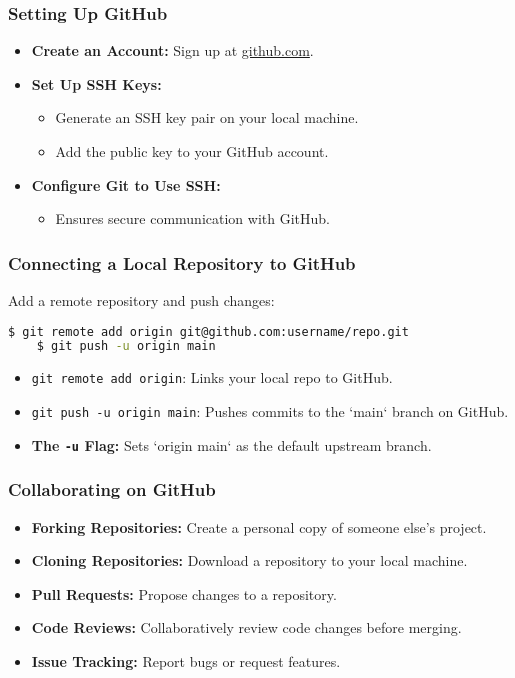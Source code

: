 \begin{frame}
	\frametitle{Setting Up GitHub}
	\begin{itemize}
		\item \textbf{Create an Account:} Sign up at \href{https://github.com}{github.com}.
		\item \textbf{Set Up SSH Keys:}
		\begin{itemize}
			\item Generate an SSH key pair on your local machine.
			\item Add the public key to your GitHub account.
		\end{itemize}
		\item \textbf{Configure Git to Use SSH:}
		\begin{itemize}
			\item Ensures secure communication with GitHub.
		\end{itemize}
	\end{itemize}
\end{frame}


\begin{frame}[fragile]
	\frametitle{Connecting a Local Repository to GitHub}
	Add a remote repository and push changes:
	\begin{lstlisting}[language=bash]
	$ git remote add origin git@github.com:username/repo.git
	$ git push -u origin main
	\end{lstlisting}
	\begin{itemize}
		\item \texttt{git remote add origin}: Links your local repo to GitHub.
		\item \texttt{git push -u origin main}: Pushes commits to the `main` branch on GitHub.
		\item \textbf{The \texttt{-u} Flag:} Sets `origin main` as the default upstream branch.
	\end{itemize}
\end{frame}

\begin{frame}
	\frametitle{Collaborating on GitHub}
	\begin{itemize}
		\item \textbf{Forking Repositories:} Create a personal copy of someone else's project.
		\item \textbf{Cloning Repositories:} Download a repository to your local machine.
		\item \textbf{Pull Requests:} Propose changes to a repository.
		\item \textbf{Code Reviews:} Collaboratively review code changes before merging.
		\item \textbf{Issue Tracking:} Report bugs or request features.
	\end{itemize}
\end{frame}

